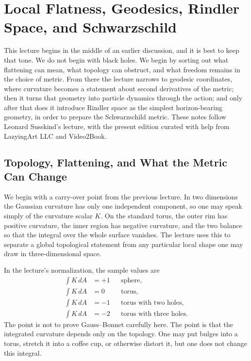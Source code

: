 \chapter{Local Flatness, Geodesics, Rindler Space, and Schwarzschild}

This lecture begins in the middle of an earlier discussion, and it is best to keep that tone. We do not begin with black holes. We begin by sorting out what flattening can mean, what topology can obstruct, and what freedom remains in the choice of metric. From there the lecture narrows to geodesic coordinates, where curvature becomes a statement about second derivatives of the metric; then it turns that geometry into particle dynamics through the action; and only after that does it introduce Rindler space as the simplest horizon-bearing geometry, in order to prepare the Schwarzschild metric. These notes follow Leonard Susskind's lecture, with the present edition curated with help from LazyingArt LLC and Video2Book.

\section{Topology, Flattening, and What the Metric Can Change}

We begin with a carry-over point from the previous lecture. In two dimensions the Gaussian curvature has only one independent component, so one may speak simply of the curvature scalar \(K\). On the standard torus, the outer rim has positive curvature, the inner region has negative curvature, and the two balance so that the integral over the whole surface vanishes. The lecture uses this to separate a global topological statement from any particular local shape one may draw in three-dimensional space.

In the lecture's normalization, the sample values are
\begin{align}
\int K\,dA &= +1 && \text{sphere}, \\
\int K\,dA &= 0 && \text{torus}, \\
\int K\,dA &= -1 && \text{torus with two holes}, \\
\int K\,dA &= -2 && \text{torus with three holes}.
\end{align}
The point is not to prove Gauss--Bonnet carefully here. The point is that the integrated curvature depends only on the topology. One may put bulges into a torus, stretch it into a coffee cup, or otherwise distort it, but one does not change this integral.

